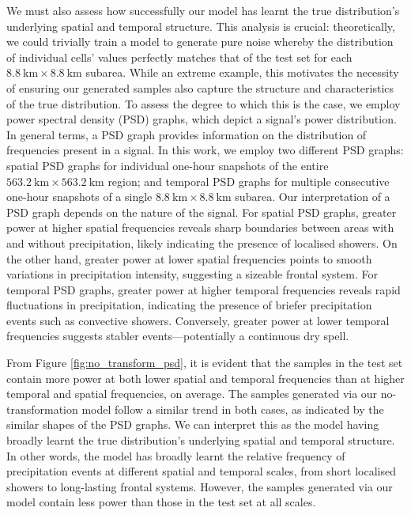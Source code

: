 \documentclass[ oneside,%
                    author={George Herbert},
                    degree={MSci},
                     title={Diffusion Models for Time-Evolving Precipitation Fields},
                  subtitle={}]{dissertation}
\begin{document}
We must also assess how successfully our model has learnt the true distribution's underlying spatial and temporal structure. This analysis is crucial: theoretically, we could trivially train a model to generate pure noise whereby the distribution of individual cells' values perfectly matches that of the test set for each $8.8\ \mathrm{km}\times 8.8\ \mathrm{km}$ subarea. While an extreme example, this motivates the necessity of ensuring our generated samples also capture the structure and characteristics of the true distribution. To assess the degree to which this is the case, we employ power spectral density (PSD) graphs, which depict a signal's power distribution. In general terms, a PSD graph provides information on the distribution of frequencies present in a signal. In this work, we employ two different PSD graphs: spatial PSD graphs for individual one-hour snapshots of the entire $563.2\ \mathrm{km}\times 563.2\ \mathrm{km}$ region; and temporal PSD graphs for multiple consecutive one-hour snapshots of a single $8.8\ \mathrm{km}\times 8.8\ \mathrm{km}$ subarea. Our interpretation of a PSD graph depends on the nature of the signal. For spatial PSD graphs, greater power at higher spatial frequencies reveals sharp boundaries between areas with and without precipitation, likely indicating the presence of localised showers. On the other hand, greater power at lower spatial frequencies points to smooth variations in precipitation intensity, suggesting a sizeable frontal system. For temporal PSD graphs, greater power at higher temporal frequencies reveals rapid fluctuations in precipitation, indicating the presence of briefer precipitation events such as convective showers. Conversely, greater power at lower temporal frequencies suggests stabler events---potentially a continuous dry spell. 

From Figure \ref{fig:no_transform_psd}, it is evident that the samples in the test set contain more power at both lower spatial and temporal frequencies than at higher temporal and spatial frequencies, on average. The samples generated via our no-transformation model follow a similar trend in both cases, as indicated by the similar shapes of the PSD graphs. We can interpret this as the model having broadly learnt the true distribution's underlying spatial and temporal structure. In other words, the model has broadly learnt the relative frequency of precipitation events at different spatial and temporal scales, from short localised showers to long-lasting frontal systems. However, the samples generated via our model contain less power than those in the test set at all scales.
\end{document}
